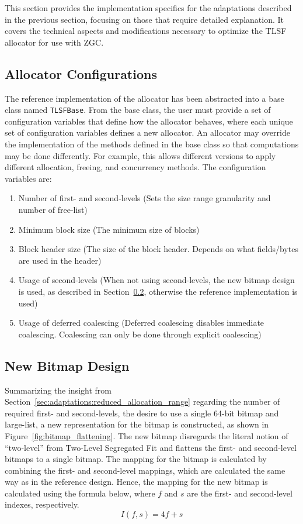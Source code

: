 
This section provides the implementation specifics for the adaptations described in the previous section, focusing on those that require detailed explanation. It covers the technical aspects and modifications necessary to optimize the TLSF allocator for use with ZGC.

\subsection{Allocator Configurations}

The reference implementation of the allocator has been abstracted into a base class named \texttt{TLSFBase}. From the base class, the user must provide a set of configuration variables that define how the allocator behaves, where each unique set of configuration variables defines a new allocator. An allocator may override the implementation of the methods defined in the base class so that computations may be done differently. For example, this allows different versions to apply different allocation, freeing, and concurrency methods. The configuration variables are:

\begin{enumerate}
    \item Number of first- and second-levels (Sets the size range granularity and number of free-list)
    \item Minimum block size (The minimum size of blocks)
    \item Block header size (The size of the block header. Depends on what fields/bytes are used in the header)
    \item Usage of second-levels (When not using second-levels, the new bitmap design is used, as described in Section~\ref{sec:adaptations_impl:bitmap_design}, otherwise the reference implementation is used)
    \item Usage of deferred coalescing (Deferred coalescing disables immediate coalescing. Coalescing can only be done through explicit coalescing)
\end{enumerate}

\subsection{New Bitmap Design}
\label{sec:adaptations_impl:bitmap_design}

Summarizing the insight from Section~\ref{sec:adaptations:reduced_allocation_range} regarding the number of required first- and second-levels, the desire to use a single 64-bit bitmap and large-list, a new representation for the bitmap is constructed, as shown in Figure~\ref{fig:bitmap_flattening}. The new bitmap disregards the literal notion of ``two-level'' from Two-Level Segregated Fit and flattens the first- and second-level bitmaps to a single bitmap. The mapping for the bitmap is calculated by combining the first- and second-level mappings, which are calculated the same way as in the reference design. Hence, the mapping for the new bitmap is calculated using the formula below, where $f$ and $s$ are the first- and second-level indexes, respectively.
\[
    I(f, s) = 4f + s
\]

